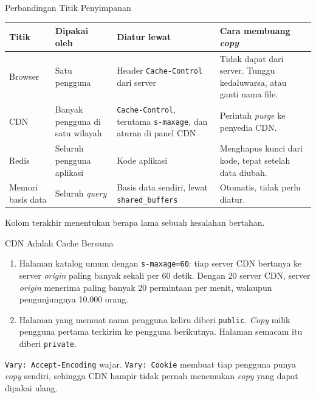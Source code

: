\documentclass[aspectratio=169, table, 12pt]{beamer}
\begin{document}
\begin{frame}{{\Large Perbandingan Titik Penyimpanan}}
  \vspace{4pt}
  \centering
  {\scriptsize
  \begin{tabularx}{\textwidth}{lYYY}
    \hline
    \textbf{Titik} & \textbf{Dipakai oleh} & \textbf{Diatur lewat} & \textbf{Cara membuang \textit{copy}} \\
    \hline
    Browser & Satu pengguna & Header \texttt{Cache-Control} dari server & Tidak dapat dari server. Tunggu kedaluwarsa, atau ganti nama file. \\
    \hline
    CDN & Banyak pengguna di satu wilayah & \texttt{Cache-Control}, terutama \texttt{s-maxage}, dan aturan di panel CDN & Perintah \textit{purge} ke penyedia CDN. \\
    \hline
    Redis & Seluruh pengguna aplikasi & Kode aplikasi & Menghapus kunci dari kode, tepat setelah data diubah. \\
    \hline
    Memori basis data & Seluruh \textit{query} & Basis data sendiri, lewat \texttt{shared\_buffers} & Otomatis, tidak perlu diatur. \\
    \hline
  \end{tabularx}}

  \vspace{6pt}
  {\footnotesize Kolom terakhir menentukan berapa lama sebuah kesalahan
  bertahan.}
\end{frame}

\begin{frame}{{\Large CDN Adalah Cache Bersama}}
  \vspace{8pt}
  \begin{enumerate}
    \item Halaman katalog umum dengan \texttt{s-maxage=60}: tiap server CDN
          bertanya ke server \textit{origin} paling banyak sekali per 60 detik. Dengan 20
          server CDN, server \textit{origin} menerima paling banyak 20 permintaan per
          menit, walaupun pengunjungnya 10.000 orang.
    \item Halaman yang memuat nama pengguna keliru diberi \texttt{public}.
          \textit{Copy} milik pengguna pertama terkirim ke pengguna berikutnya.
          Halaman semacam itu diberi \texttt{private}.
  \end{enumerate}
  \vspace{6pt}
  {\footnotesize \texttt{Vary: Accept-Encoding} wajar. \texttt{Vary: Cookie}
  membuat tiap pengguna punya \textit{copy} sendiri, sehingga CDN hampir tidak pernah
  menemukan \textit{copy} yang dapat dipakai ulang.}
\end{frame}
\end{document}
